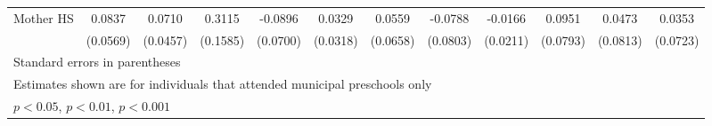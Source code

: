 \begin{table}[htbp]
\begin{tabular}{l*{11}{c}}
\addlinespace
Mother HS   &      0.0837         &      0.0710         &      0.3115\sym{*}  &     -0.0896         &      0.0329         &      0.0559         &     -0.0788         &     -0.0166         &      0.0951         &      0.0473         &      0.0353         \\
            &    (0.0569)         &    (0.0457)         &    (0.1585)         &    (0.0700)         &    (0.0318)         &    (0.0658)         &    (0.0803)         &    (0.0211)         &    (0.0793)         &    (0.0813)         &    (0.0723)         \\
\bottomrule
\multicolumn{12}{l}{\footnotesize Standard errors in parentheses}\\
\multicolumn{12}{l}{\footnotesize Estimates shown are for individuals that attended municipal preschools only}\\
\multicolumn{12}{l}{\footnotesize \sym{*} \(p<0.05\), \sym{**} \(p<0.01\), \sym{***} \(p<0.001\)}\\
\end{tabular}
\end{table}
